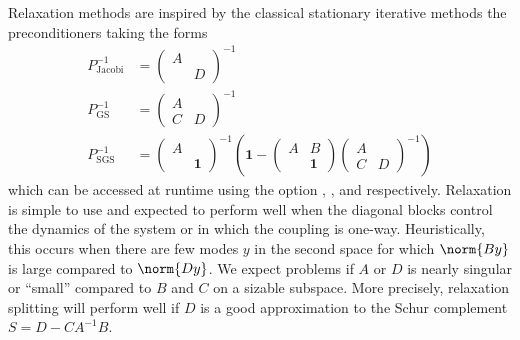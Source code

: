 Relaxation methods are inspired by the classical stationary iterative methods the preconditioners taking the forms
\begin{align*}
  P^{-1}_{\text{Jacobi}} &= \begin{pmatrix} A & \\ & D \end{pmatrix}^{-1} \\
  P^{-1}_{\text{GS}} &= \begin{pmatrix} A & \\ C & D \end{pmatrix}^{-1} \\
  P^{-1}_{\text{SGS}} &=
      \begin{pmatrix} A & \\  & \bm 1 \end{pmatrix}^{-1}
      \left(
        \bm 1 -
        \begin{pmatrix} A & B \\ & \bm 1 \end{pmatrix}
        \begin{pmatrix} A & \\ C & D \end{pmatrix}^{-1}
      \right)
\end{align*}
which can be accessed at runtime using the {\PETSc} option , , and  respectively.
Relaxation is simple to use and expected to perform well when the diagonal blocks control the dynamics of the system or in which the coupling is one-way.
Heuristically, this occurs when there are few modes $y$ in the second space for which $\norm{B y}$ is large compared to $\norm{D y}$.
We expect problems if $A$ or $D$ is nearly singular or ``small'' compared to $B$ and $C$ on a sizable subspace.
More precisely, relaxation splitting will perform well if $D$ is a good approximation to the Schur complement $S = D - CA^{-1}B$.

